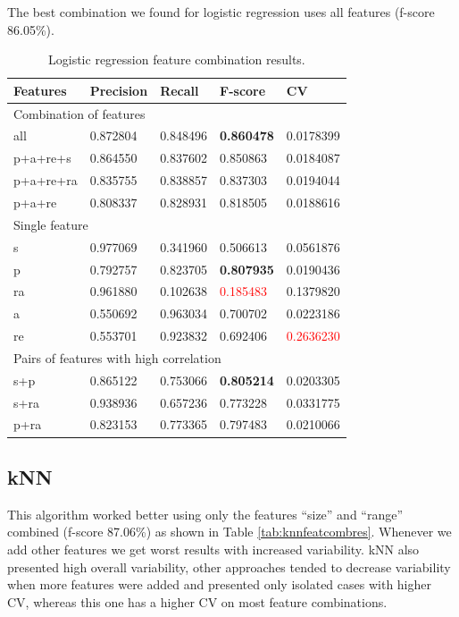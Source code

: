 The best combination we found for logistic regression uses all features (f-score
86.05\%).

\begin{table}[h]
\centering
\caption{Logistic regression feature combination results.}
\label{tab:lrfeatcombres}
\begin{tabular}{ | l | l | l | l | l |}
\hline
Features & Precision & Recall & F-score & CV \\
\hline
\multicolumn{5}{|l|}{Combination of features} \\
\hline
all      & 0.872804 & 0.848496 & \textbf{0.860478} & 0.0178399 \\
p+a+re+s & 0.864550 & 0.837602 & 0.850863 & 0.0184087 \\
p+a+re+ra& 0.835755 & 0.838857 & 0.837303 & 0.0194044 \\
p+a+re   & 0.808337 & 0.828931 & 0.818505 & 0.0188616 \\
\hline
\multicolumn{5}{|l|}{Single feature} \\
\hline
s        & 0.977069 & 0.341960 & 0.506613 & 0.0561876 \\
p        & 0.792757 & 0.823705 & \textbf{0.807935} & 0.0190436 \\
ra       & 0.961880 & 0.102638 & \textcolor{red}{0.185483} & 0.1379820 \\
a        & 0.550692 & 0.963034 & 0.700702 & 0.0223186 \\
re       & 0.553701 & 0.923832 & 0.692406 & \textcolor{red}{0.2636230} \\
\hline
\multicolumn{5}{|l|}{Pairs of features with high correlation} \\
\hline
s+p      & 0.865122 & 0.753066 & \textbf{0.805214} & 0.0203305 \\
s+ra     & 0.938936 & 0.657236 & 0.773228 & 0.0331775 \\
p+ra     & 0.823153 & 0.773365 & 0.797483 & 0.0210066 \\
\hline
\end{tabular}
\end{table}

\subsection{kNN}\label{ss:knn}
This algorithm worked better using only the features ``size'' and ``range''
combined (f-score 87.06\%) as shown in Table \ref{tab:knnfeatcombres}. Whenever
we add other features we get worst results with increased variability. kNN also
presented high overall variability, other approaches tended to decrease
variability when more features were added and presented only isolated cases with
higher CV, whereas this one has a higher CV on most feature combinations.

